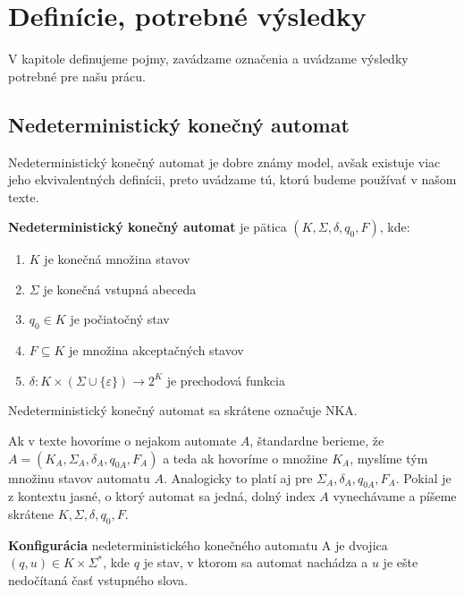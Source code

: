 \chapter{Definície, potrebné výsledky}
\label{kap:defs} %

V kapitole definujeme pojmy, zavádzame označenia a uvádzame výsledky potrebné pre našu prácu.

\section{Nedeterministický konečný automat}
Nedeterministický konečný automat je dobre známy model, avšak existuje viac jeho ekvivalentných definícii, preto uvádzame tú, ktorú budeme používať v našom texte.
\\
\begin{definition}
\textbf{Nedeterministický konečný automat} je pätica $ (K, \Sigma, \delta, q_0, F) $, kde:
\begin{enumerate}  
\item $ K $ je konečná množina stavov
\item $ \Sigma $ je konečná vstupná abeceda
\item $ q_0 \in K $ je počiatočný stav
\item $ F \subseteq K $ je množina akceptačných stavov
\item $ \delta : K \times (\Sigma \cup \lbrace \varepsilon \rbrace) \rightarrow 2^{K} $ je prechodová funkcia
\end{enumerate}

\end{definition}

\begin{note}
Nedeterministický konečný automat sa skrátene označuje NKA.
\end{note}

\begin{note}
Ak v texte hovoríme o nejakom automate $ A $, štandardne berieme, že $ A=(K_A, \Sigma_A, \delta_A, q_{0A}, F_A) $ a teda ak hovoríme o množine $ K_A $, myslíme tým množinu stavov automatu $ A $. Analogicky to platí aj pre $  \Sigma_A, \delta_A, q_{0A}, F_A $. Pokial je z kontextu jasné, o ktorý automat sa jedná, dolný index $ A $ vynechávame a píšeme skrátene  $ K, \Sigma, \delta, q_0, F $.
\end{note}

\begin{definition}
\textbf{Konfigurácia} nedeterministického konečného automatu A je dvojica $ (q,u) \in K \times \Sigma^{*} $, kde $ q $ je stav, v ktorom sa automat nachádza a $ u $ je ešte nedočítaná časť vstupného slova.
\end{definition}

